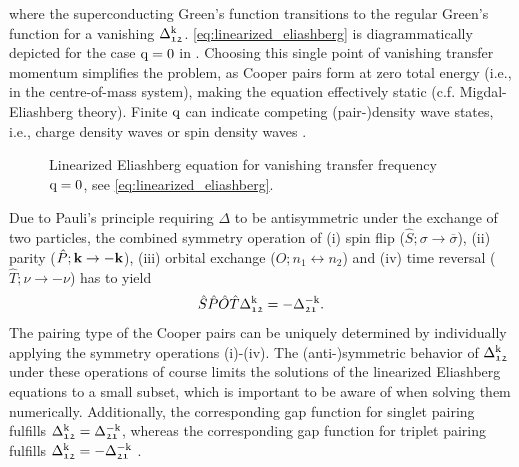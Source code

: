 \documentclass[../../main.tex]{subfiles}
\begin{document}
where the superconducting Green's function transitions to the regular Green's function for a vanishing $\Delta_{\mathfrak{12}}^{\text{k}}$. \eqref{eq:linearized_eliashberg} is diagrammatically depicted for the case $\text{q}=0$ in . Choosing this single point of vanishing transfer momentum simplifies the problem, as Cooper pairs form at zero total energy (i.e., in the centre-of-mass system), making the equation effectively static (c.f. Migdal-Eliashberg theory). Finite $\text{q}$ can indicate competing (pair-)density wave states, i.e., charge density waves or spin density waves \cite{Yoshida2021}.
\begin{figure}[ht!]
	\centering
  	
  	\caption{Linearized Eliashberg equation for vanishing transfer frequency $\text{q}=0$, see \eqref{eq:linearized_eliashberg}.}
  	\label{fig:linearized_eliashberg}
\end{figure}

Due to Pauli's principle requiring $\Delta$ to be antisymmetric under the exchange of two particles, the combined symmetry operation of (i) spin flip ($\hat S; \sigma\to\overline{\sigma}$), (ii) parity ($\hat P; \textbf{k}\to-\textbf{k}$), (iii) orbital exchange ($\hat O; n_1 \leftrightarrow n_2$) and (iv) time reversal ($\hat T; \nu\to-\nu$) has to yield \cite{Riseborough2004}
\begin{align}
	\hat S\hat P\hat O\hat T \Delta_{\mathfrak{12}}^{\text{k}} = -\Delta_{\mathfrak{21}}^{-\text{k}}.
\end{align}
The pairing type of the Cooper pairs can be uniquely determined by individually applying the symmetry operations (i)-(iv). The (anti-)symmetric behavior of $\Delta_{\mathfrak{12}}^{\text{k}}$ under these operations of course limits the solutions of the linearized Eliashberg equations to a small subset, which is important to be aware of when solving them numerically. Additionally, the corresponding gap function for singlet pairing fulfills $\Delta^{\text{k}}_{\mathfrak{12}}=\Delta^{-\text{k}}_{\mathfrak{21}}$, whereas the corresponding gap function for triplet pairing fulfills $\Delta^{\text{k}}_{\mathfrak{12}}=-\Delta_{\mathfrak{21}}^{-\text{k}}$ \cite{Nourafkan2016}.
\end{document}
